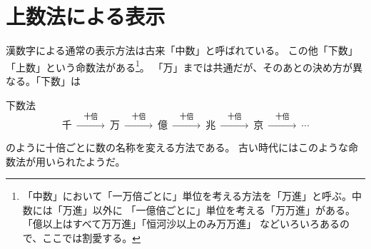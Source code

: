 \documentclass[dvipdfmx]{jsarticle}
\begin{document}
\section{上数法による表示}
\makeatletter
漢数字による通常の表示方法は古来「中数」と呼ばれている。
この他「下数」「上数」という命数法がある\footnote{%
「中数」において「一万倍ごとに」単位を考える方法を「万進」と呼ぶ。中数には「万進」以外に
「一億倍ごとに」単位を考える「万万進」がある。「億以上はすべて万万進」「恒河沙以上のみ万万進」
などいろいろあるので、ここでは割愛する。}。
「万」までは共通だが、そのあとの決め方が異なる。「下数」は
\begin{itembox}[l]{下数法}
\[
\text{千}
\ \xrightarrow{\quad\text{十倍}\quad}\ {}
\text{万}
\ \xrightarrow{\quad\text{十倍}\quad}\ {}
\text{億}
\ \xrightarrow{\quad\text{十倍}\quad}\ {}
\text{兆}
\ \xrightarrow{\quad\text{十倍}\quad}\ {}
\text{京}
\ \xrightarrow{\quad\text{十倍}\quad}\ {}\cdots
\]
\end{itembox}
のように十倍ごとに数の名称を変える方法である。
古い時代にはこのような命数法が用いられたようだ。
\end{document}
